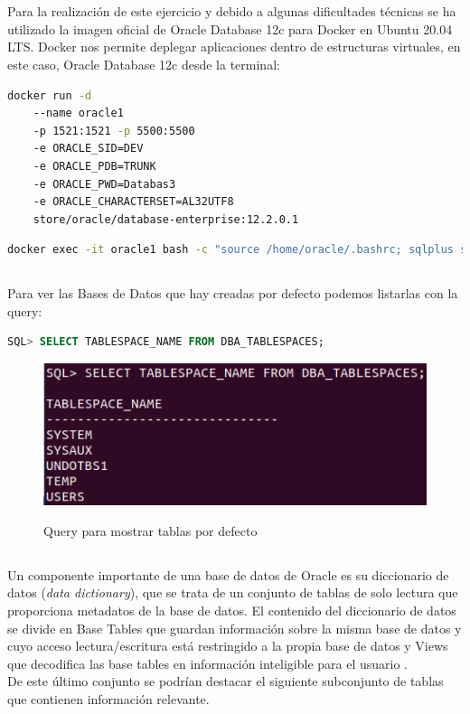 \documentclass[10pt,a4paper]{article}
\begin{document}
\pagebreak
\section{}
Para la realización de este ejercicio y debido a algunas dificultades técnicas se ha utilizado la imagen oficial de Oracle Database 12c para Docker 
\cite{medium} en Ubuntu 20.04 LTS. Docker nos permite deplegar aplicaciones dentro de estructuras virtuales, en este caso, Oracle Database 12c \cite{dockerhub} desde la terminal:
\begin{lstlisting}[language=bash]
docker run -d 
	--name oracle1 
	-p 1521:1521 -p 5500:5500 
	-e ORACLE_SID=DEV 
	-e ORACLE_PDB=TRUNK 
	-e ORACLE_PWD=Databas3 
	-e ORACLE_CHARACTERSET=AL32UTF8 
	store/oracle/database-enterprise:12.2.0.1
\end{lstlisting}

\begin{lstlisting}[language=bash]
docker exec -it oracle1 bash -c "source /home/oracle/.bashrc; sqlplus sys/Oradoc_db1@ORCLCDB as sysdba"
\end{lstlisting}

\subsection{}
Para ver las Bases de Datos que hay creadas por defecto podemos listarlas con la query:

\begin{lstlisting}[language=sql]
SQL> SELECT TABLESPACE_NAME FROM DBA_TABLESPACES;
\end{lstlisting}

\begin{figure}[h!]
  \centering
  \includegraphics[scale=0.7]{SELECT.png}\\
  \caption{Query para mostrar tablas por defecto}
  \label{fig:select}
\end{figure}

\subsection{}
Un componente importante de una base de datos de Oracle es su diccionario de datos (\textit{data dictionary}), que se trata de un conjunto de tablas de solo lectura que proporciona metadatos de la base de datos. El contenido del diccionario de datos se divide en Base Tables que guardan información sobre la misma base de datos y cuyo acceso lectura/escritura está restringido a la propia base de datos y Views que decodifica las base tables en información inteligible para el usuario \cite{metadata}.\\
De este último conjunto se podrían destacar el siguiente subconjunto de tablas que contienen información relevante.
\end{document}
